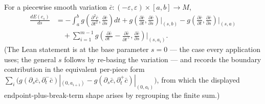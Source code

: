 \begin{lemma}
  \label{lem:pet-ch5-first-variation-formula}


  For a piecewise smooth variation $\bar c:(-\varepsilon,\varepsilon)\times[a,b]\to M$,
  \begin{align*}
    \frac{dE(c_s)}{ds}
    &=-\int_a^bg\!\left(\frac{\partial^2\bar c}{\partial t^2},\frac{\partial\bar c}{\partial s}\right)dt
    +g\!\left(\frac{\partial\bar c}{\partial t},\frac{\partial\bar c}{\partial s}\right)\Big|_{(s,b)}
    -g\!\left(\frac{\partial\bar c}{\partial t},\frac{\partial\bar c}{\partial s}\right)\Big|_{(s,a)}\\
    &\quad+\sum_{i=1}^{m-1}g\!\left(\frac{\partial\bar c}{\partial t^-}-\frac{\partial\bar c}{\partial t^+},
      \frac{\partial\bar c}{\partial s}\right)\Big|_{(s,a_i)}.
  \end{align*}
  (The Lean statement is at the base parameter $s=0$ --- the case every
  application uses; the general $s$ follows by re-basing the variation --- and
  records the boundary contribution in the equivalent per-piece form
  $\sum_i\big(g(\partial_s\bar c,\partial_t^-\bar c)|_{(0,a_{i+1})}
  -g(\partial_s\bar c,\partial_t^+\bar c)|_{(0,a_i)}\big)$, from which the
  displayed endpoint-plus-break-term shape arises by regrouping the finite
  sum.)
\end{lemma}
